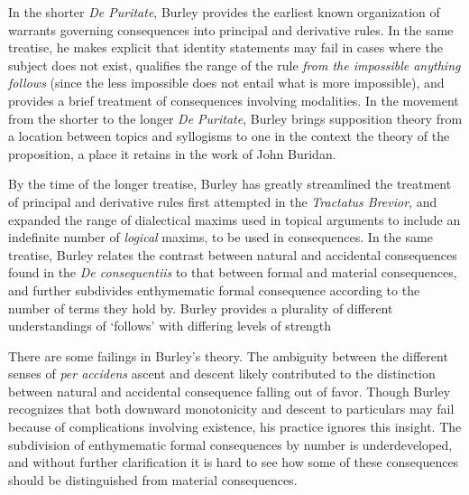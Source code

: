 \documentclass[]{birkjour}
\begin{document}
In the shorter \textit{De Puritate}, Burley provides the earliest known organization of warrants governing consequences into principal and derivative rules. In the same treatise, he makes explicit that identity statements may fail in cases where the subject does not exist, qualifies the range of the rule \textit{from the impossible anything follows}  (since the less impossible does not entail what is more impossible), and provides a brief treatment of consequences involving modalities. In the movement from the shorter to the longer \textit{De Puritate}, Burley brings supposition theory from a location between topics and syllogisms to one in the context the theory of the proposition, a place it retains in the work of John Buridan.
	
By the time of the longer treatise, Burley has greatly streamlined the treatment of principal and derivative rules first attempted in the \textit{Tractatus Brevior}, and expanded the range of dialectical maxims used in topical arguments to include an indefinite number of \textit{logical} maxims, to be used in consequences. In the same treatise, Burley relates the contrast between natural and accidental consequences found in the \textit{De consequentiis} to that between formal and material consequences, and further subdivides enthymematic formal consequence according to the number of terms they hold by. Burley provides a plurality of different understandings of `follows' with differing levels of strength 
	
There are some failings in Burley's theory. The ambiguity between the different senses of \textit{per accidens} ascent and descent likely contributed to the distinction between natural and accidental consequence falling out of favor. Though Burley recognizes that both downward monotonicity and descent to particulars may fail because of complications involving existence, his practice ignores this insight. The subdivision of enthymematic formal consequences by number is underdeveloped, and without further clarification it is hard to see how some of these consequences should be distinguished from material consequences. 
	
\end{document}
